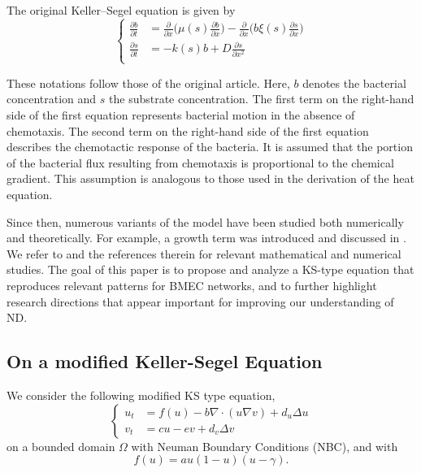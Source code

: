 \documentclass[final,1p,times]{elsarticle}
\begin{document}
The original Keller--Segel \cite{Kel1971} equation is given by
\begin{equation}
\label{eq:KS}
    \left\{ \begin{array}{rl}
         \frac{\partial b}{ \partial t}&=\frac{\partial }{ \partial x}\big(\mu(s) \frac{\partial b}{ \partial x} \big) -\frac{\partial }{ \partial x}\big(b\xi(s) \frac{\partial s}{ \partial x} \big)  \\
           \frac{\partial s}{ \partial t}&=-k(s)b+D \frac{\partial s}{ \partial x^2}  \\
    \end{array}
    \right.
\end{equation}

These notations follow those of the original article. Here, $b$ denotes the bacterial concentration and $s$ the substrate concentration. The first term on the right-hand side of the first equation represents bacterial motion in the absence of chemotaxis. The second term on the right-hand side of the first equation describes the chemotactic response of the bacteria. It is assumed that the portion of the bacterial flux resulting from chemotaxis is proportional to the chemical gradient. This assumption is analogous to those used in the derivation of the heat equation. 

Since then, numerous variants of the model have been studied both numerically and theoretically. For example, a growth term was introduced and discussed in \cite{Mim1996}. We refer to \cite{Mim1996,Dol2024,Cor2004,Kut2012} and the references therein for relevant mathematical and numerical studies. The goal of this paper is to propose and analyze a KS-type equation that reproduces relevant patterns for BMEC networks, and to further highlight research directions that appear important for improving our understanding of ND.
\subsection{On a modified Keller-Segel Equation}
We consider the following modified KS type equation,
\begin{equation}
\left\{
    \begin{array}{rl}
         u_t&=f(u)-b\nabla \cdot (u\nabla v)+d_u\Delta u  \\
         v_t&=cu-ev+d_v\Delta v 
    \end{array}
    \right.
    \label{eq:mKS}
\end{equation}
on a bounded domain $\Omega$ with Neuman Boundary Conditions (NBC), and with 
\[f(u)=au(1-u)(u-\gamma).\]
\end{document}
